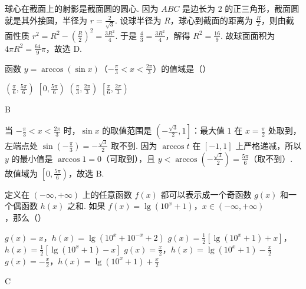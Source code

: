 \begin{solution}
球心在截面上的射影是截面圆的圆心. 因为 \(ABC\) 是边长为 \(2\) 的正三角形，截面圆就是其外接圆，半径为 \(r = \frac{2}{\sqrt{3}}\). 设球半径为 \(R\)，球心到截面的距离为 \(\frac{R}{2}\)，则由截面性质 \(r^2 = R^2 - \left(\frac{R}{2}\right)^2 = \frac{3R^2}{4}\). 于是 \(\frac{4}{3} = \frac{3R^2}{4}\)，解得 \(R^2 = \frac{16}{9}\). 故球面面积为 \(4\pi R^2 = \frac{64}{9}\pi\)，故选 D.
\end{solution}

\begin{problem}
函数 \(y = \arccos \left(\sin x\right)\)（\(-\frac{\pi}{3} < x < \frac{2\pi}{3}\)）的值域是（\quad）

\choices
    {\(\left(\frac{\pi}{6}, \frac{5\pi}{6}\right)\)}
    {\(\left[0, \frac{5\pi}{6}\right)\)}
    {\(\left(\frac{\pi}{3}, \frac{2\pi}{3}\right)\)}
    {\(\left[\frac{\pi}{6}, \frac{2\pi}{3}\right)\)}
\end{problem}

\begin{answer}
B
\end{answer}

\begin{solution}
当 \(-\frac{\pi}{3} < x < \frac{2\pi}{3}\) 时，\(\sin x\) 的取值范围是 \(\left(-\frac{\sqrt{3}}{2}, 1\right]\)：最大值 \(1\) 在 \(x = \frac{\pi}{2}\) 处取到，左端点处 \(\sin \left(-\frac{\pi}{3}\right) = -\frac{\sqrt{3}}{2}\) 取不到. 因为 \(\arccos t\) 在 \([-1, 1]\) 上严格递减，所以 \(y\) 的最小值是 \(\arccos 1 = 0\)（可取到），且 \(y < \arccos \left(-\frac{\sqrt{3}}{2}\right) = \frac{5\pi}{6}\)（取不到）. 故值域为 \(\left[0, \frac{5\pi}{6}\right)\)，故选 B.
\end{solution}

\begin{problem}
定义在 \((- \infty, + \infty)\) 上的任意函数 \(f(x)\) 都可以表示成一个奇函数 \(g(x)\) 和一个偶函数 \(h(x)\) 之和. 如果 \(f(x) = \lg \left(10^x + 1\right)\)，\(x \in (-\infty, +\infty)\)，那么（\quad）

\choices
    {\(g(x) = x\)，\(h(x) = \lg \left(10^x + 10^{-x} + 2\right)\)}
    {\(g(x) = \frac{1}{2}\left[\lg \left(10^x + 1\right) + x\right]\)，\(h(x) = \frac{1}{2}\left[\lg \left(10^x + 1\right) - x\right]\)}
    {\(g(x) = \frac{x}{2}\)，\(h(x) = \lg \left(10^x + 1\right) - \frac{x}{2}\)}
    {\(g(x) = -\frac{x}{2}\)，\(h(x) = \lg \left(10^x + 1\right) + \frac{x}{2}\)}
\end{problem}

\begin{answer}
C
\end{answer}

